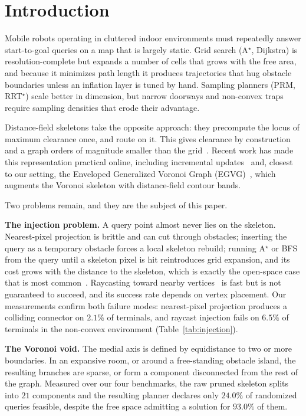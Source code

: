 \documentclass[conference]{IEEEtran}
\begin{document}
\section{Introduction}

Mobile robots operating in cluttered indoor environments must repeatedly answer start-to-goal queries on a map that is largely static. Grid search (A$^\star$, Dijkstra) is resolution-complete but expands a number of cells that grows with the free area, and because it minimizes path length it produces trajectories that hug obstacle boundaries unless an inflation layer is tuned by hand. Sampling planners (PRM, RRT$^\star$) scale better in dimension, but narrow doorways and non-convex traps require sampling densities that erode their advantage.

Distance-field skeletons take the opposite approach: they precompute the locus of maximum clearance once, and route on it. This gives clearance by construction and a graph orders of magnitude smaller than the grid~\cite{lau2013,oleynikova2018,qi2022pruned}. Recent work has made this representation practical online, including incremental updates~\cite{lau2013} and, closest to our setting, the Enveloped Generalized Voronoi Graph (EGVG)~\cite{qi2025egvg}, which augments the Voronoi skeleton with distance-field contour bands.

Two problems remain, and they are the subject of this paper.

\textbf{The injection problem.} A query point almost never lies on the skeleton. Nearest-pixel projection is brittle and can cut through obstacles; inserting the query as a temporary obstacle forces a local skeleton rebuild; running A$^\star$ or BFS from the query until a skeleton pixel is hit reintroduces grid expansion, and its cost grows with the distance to the skeleton, which is exactly the open-space case that is most common~\cite{qi2025egvg,oleynikova2018}. Raycasting toward nearby vertices~\cite{qi2025egvg} is fast but is not guaranteed to succeed, and its success rate depends on vertex placement. Our measurements confirm both failure modes: nearest-pixel projection produces a colliding connector on $2.1\%$ of terminals, and raycast injection fails on $6.5\%$ of terminals in the non-convex environment (Table~\ref{tab:injection}).

\textbf{The Voronoi void.} The medial axis is defined by equidistance to two or more boundaries. In an expansive room, or around a free-standing obstacle island, the resulting branches are sparse, or form a component disconnected from the rest of the graph. Measured over our four benchmarks, the raw pruned skeleton splits into $21$ components and the resulting planner declares only $24.0\%$ of randomized queries feasible, despite the free space admitting a solution for $93.0\%$ of them.
\end{document}
